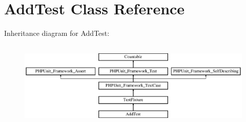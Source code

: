 \section{Add\+Test Class Reference}
\label{class_add_test}
Inheritance diagram for Add\+Test\+:\begin{figure}[H]
\begin{center}
\leavevmode
\includegraphics[height=4.129793cm]{class_add_test}
\end{center}
\end{figure}
